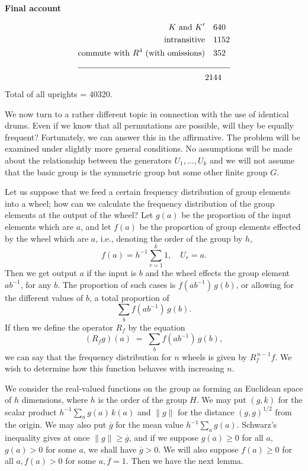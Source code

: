 \documentclass[12pt]{article}
\begin{document}
\medskip

\noindent
{\bf Final account}

\smallskip

\noindent
\[
\begin{aligned}
K\ \text{and}\ K' &\quad 640\\
\text{intransitive} &\quad 1152\\
\text{commute with }R^4\ \text{(with omissions)} &\quad 352\\
\cline{1-2}
& 2144
\end{aligned}
\]
Total of all uprights = 40320.

\bigskip

We now turn to a rather different topic in connection with the use of identical drums. Even if we know that all permutations are possible, will they be equally frequent? Fortunately, we can answer this in the affirmative. The problem will be examined under slightly more general conditions. No assumptions will be made about the relationship between the generators $U_1,\dots,U_k$ and we will not assume that the basic group is the symmetric group but some other finite group $G$.

\medskip

Let us suppose that we feed a certain frequency distribution of group elements into a wheel; how can we calculate the frequency distribution of the group elements at the output of the wheel? Let $g(a)$ be the proportion of the input elements which are $a$, and let $f(a)$ be the proportion of group elements effected by the wheel which are $a$, i.e., denoting the order of the group by $h$,
\[
f(a) = h^{-1}\sum_{r=1}^k 1,\quad U_r = a.
\]
Then we get output $a$ if the input is $b$ and the wheel effects the group element $ab^{-1}$, for any $b$. The proportion of such cases is $f(ab^{-1})\,g(b)$, or allowing for the different values of $b$, a total proportion of
\[
\sum_b f(ab^{-1})\,g(b).
\]
If then we define the operator $R_f$ by the equation
\[
(R_f g)(a) \;=\; \sum_b f(ab^{-1})\,g(b),
\]
we can say that the frequency distribution for $n$ wheels is given by $R_f^{\,n-1} f$. We wish to determine how this function behaves with increasing $n$.

\medskip

We consider the real‐valued functions on the group as forming an Euclidean space of $h$ dimensions, where $h$ is the order of the group $H$. We may put $(g,k)$ for the scalar product $h^{-1}\sum_a g(a)\,k(a)$ and $\|g\|$ for the distance $(g,g)^{1/2}$ from the origin. We may also put $\overline{g}$ for the mean value $h^{-1}\sum_a g(a)$. Schwarz’s inequality gives at once $\|g\|\ge\overline{g}$, and if we suppose $g(a)\ge 0$ for all $a$, $g(a)>0$ for some $a$, we shall have $\overline{g}>0$. We will also suppose $f(a)\ge 0$ for all $a, f(a)>0$ for some $a, \overline{f}=1.$ Then we have the next lemma.
\end{document}
